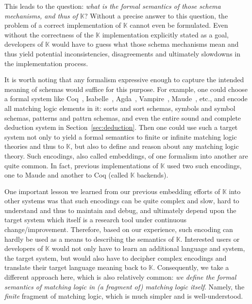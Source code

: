 \documentclass[UTF8,11pt]{article}
\theoremstyle{plain}
\theoremstyle{definition}
\theoremstyle{remark}
\newcommand{\K}{\mbox{$\mathbb{K}$}\xspace}
\begin{document}
This leads to the question:
\emph{what is the formal semantics of those schema mechanisms, and thus
of \K}?
Without a precise answer to this question, the problem of a correct
implementation of \K cannot even be formulated.
Even without the correctness of the \K implementation explicitly stated as a goal,
developers of \K would have to guess what those schema mechanisms mean and
thus yield potential inconsistencies, disagreements and ultimately slowdowns
in the implementation process.

It is worth noting that any formalism expressive enough to capture the intended
meaning of schemas would suffice for this purpose.
For example, one could choose a formal system like Coq~\cite{coq},
Isabelle~\cite{isabelle}, Agda~\cite{agda}, Vampire~\cite{vampire},
Maude~\cite{clavel-et-al99a}, etc., and encode all matching logic elements in 
it:
sorts and sort schemas, symbols and symbol schemas, patterns and
pattrn schemas, and even the entire sound and complete deduction system in
Section~\ref{sec:deduction}.
Then one could use such a target system not only to yield a formal semantics
to finite or infinite matching logic theories and thus to \K, but also to
define and reason about any matching logic theory.
Such encodings, also called embeddings, of one formalism into another are
quite common.
In fact, previous implementations of \K used two such encodings, one to
Maude and another to Coq (called \K backends).

One important lesson we learned from our previous embedding efforts of \K
into other systems was that such encodings can be quite complex and slow,
hard to understand and thus to maintain and debug, and ultimately depend
upon the target system which itself is a research tool under continuous
change/improvement.
Therefore, based on our experience, such encoding can hardly
be used as a means to describing the semantics of \K.
Interested users or developers of \K would not only have to learn an
additional language and system, the target system, but would also have to
decipher complex encodings and translate their target language meaning back
to \K.
Consequently, we take a different approach here, which is also relatively
common:
\emph{we define the formal semantics of matching logic in (a fragment of)
matching logic itself}.
Namely, the \emph{finite} fragment of matching logic, which is much simpler
and is well-understood.
\end{document}
